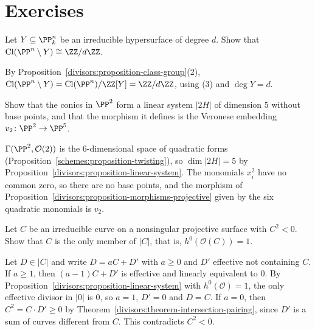 \section{Exercises}\label{divisors:section-exercises}

\begin{exercise}\label{divisors:exercise-cl-minus-hypersurface}
Let $Y \subseteq \PP^n_k$ be an irreducible hypersurface of degree $d$. Show that $\mathrm{Cl}(\PP^n \setminus Y) \cong \ZZ/d\ZZ$.
\end{exercise}

\begin{solution}
By Proposition~\ref{divisors:proposition-class-group}(2), $\mathrm{Cl}(\PP^n \setminus Y) = \mathrm{Cl}(\PP^n)/\ZZ[Y] = \ZZ/d\ZZ$, using (3) and $\deg Y = d$.
\end{solution}

\begin{exercise}\label{divisors:exercise-linear-system-conics}
Show that the conics in $\PP^2$ form a linear system $|2H|$ of dimension $5$ without base points, and that the morphism it defines is the Veronese embedding
$v_2 \colon \PP^2 \to \PP^5$.
\end{exercise}

\begin{solution}
$\Gamma(\PP^2, \mathcal{O}(2))$ is the $6$-dimensional space of quadratic forms (Proposition~\ref{schemes:proposition-twisting}), so $\dim|2H| = 5$ by
Proposition~\ref{divisors:proposition-linear-system}. The monomials $x_i^2$ have no common zero, so there are no base points, and the morphism of
Proposition~\ref{divisors:proposition-morphisms-projective} given by the six quadratic monomials is $v_2$.
\end{solution}

\begin{exercise}\label{divisors:exercise-negative-curve}
Let $C$ be an irreducible curve on a nonsingular projective surface with $C^2 < 0$. Show that $C$ is the only member of $|C|$, that is, $h^0(\mathcal{O}(C)) = 1$.
\end{exercise}

\begin{solution}
Let $D \in |C|$ and write $D = aC + D'$ with $a \geq 0$ and $D'$ effective not containing $C$. If $a \geq 1$, then $(a - 1)C + D'$ is effective and linearly
equivalent to $0$. By Proposition~\ref{divisors:proposition-linear-system} with $h^0(\mathcal{O}) = 1$, the only effective divisor in $|0|$ is $0$, so $a = 1$, $D' = 0$ and
$D = C$. If $a = 0$, then $C^2 = C \cdot D' \geq 0$ by Theorem~\ref{divisors:theorem-intersection-pairing}, since $D'$ is a sum of curves different from $C$. This
contradicts $C^2 < 0$.
\end{solution}

